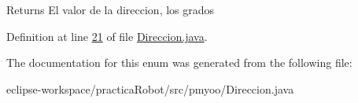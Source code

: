 \begin{DoxyReturn}{Returns}
El valor de la direccion, los grados 
\end{DoxyReturn}


Definition at line \mbox{\hyperlink{_direccion_8java_source_l00021}{21}} of file \mbox{\hyperlink{_direccion_8java_source}{Direccion.\+java}}.



The documentation for this enum was generated from the following file\+:\begin{DoxyCompactItemize}
\item 
eclipse-\/workspace/practica\+Robot/src/pmyoo/Direccion.\+java\end{DoxyCompactItemize}
